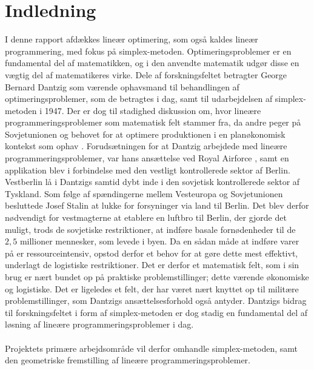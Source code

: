 \chapter{Indledning}
I denne rapport afdækkes lineær optimering, som også kaldes lineær programmering, med fokus på simplex-metoden.
Optimeringsproblemer er en fundamental del af matematikken, og i den anvendte matematik udgør disse en vægtig del af matematikeres virke. 
Dele af forskningsfeltet betragter George Bernard Dantzig som værende  ophavsmand til behandlingen af optimeringsproblemer, som de betragtes i dag, samt til udarbejdelsen af simplex-metoden \citep[side 107]{refa} i 1947.
Der er dog til stadighed diskussion om, hvor lineære programmeringsproblemer som matematisk felt stammer fra, da andre peger på Sovjetunionen og behovet for at optimere produktionen i en planøkonomisk kontekst som ophav \citep[side 155]{refb}.
Forudsætningen for at Dantzig arbejdede med lineære programmeringsproblemer, var hans ansættelse ved Royal Airforce \citep[side 107]{refa}, samt en applikation blev i forbindelse med den vestligt kontrollerede sektor af Berlin.
Vestberlin lå i Dantzigs samtid dybt inde i den sovjetisk kontrollerede sektor af Tyskland. 
Som følge af spændingerne mellem Vesteuropa og Sovjetunionen besluttede Josef Stalin at lukke for forsyninger via land til Berlin.
Det blev derfor nødvendigt for vestmagterne at etablere en luftbro til Berlin, der gjorde det muligt, trods de sovjetiske restriktioner, at indføre basale fornødenheder til de $2,5$ millioner mennesker, som levede i byen.
Da en sådan måde at indføre varer på er ressourceintensiv, opstod derfor et behov for at gøre dette mest effektivt, underlagt de logistiske restriktioner.
Det er derfor et matematisk felt, som i sin brug er nært bundet op på praktiske problemstillinger; dette værende økonomiske og logistiske.
Det er ligeledes et felt, der har været nært knyttet op til militære problemstillinger, som Dantzigs ansættelsesforhold også antyder.
Dantzigs bidrag til forskningsfeltet i form af simplex-metoden er dog stadig en fundamental del af løsning af lineære programmeringsproblemer i dag.
\\\\
Projektets primære arbejdsområde vil derfor omhandle simplex-metoden, samt den geometriske fremstilling af lineære programmeringsproblemer.
